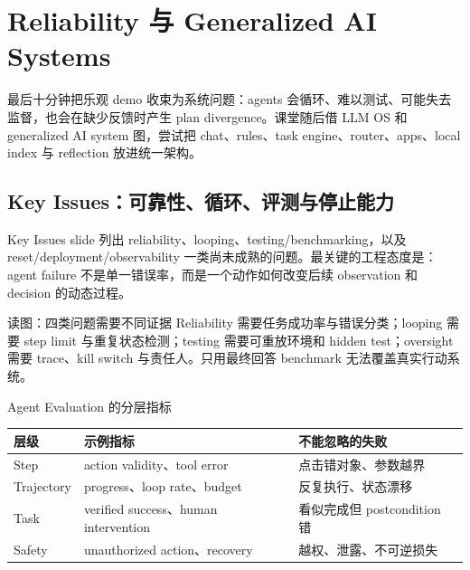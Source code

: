 \section{Reliability 与 Generalized AI Systems}

最后十分钟把乐观 demo 收束为系统问题：agents 会循环、难以测试、可能失去监督，也会在缺少反馈时产生 plan divergence。课堂随后借 LLM OS 和 generalized AI system 图，尝试把 chat、rules、task engine、router、apps、local index 与 reflection 放进统一架构。

\subsection{Key Issues：可靠性、循环、评测与停止能力}

Key Issues slide 列出 reliability、looping、testing/benchmarking，以及 reset/deployment/observability 一类尚未成熟的问题。最关键的工程态度是：agent failure 不是单一错误率，而是一个动作如何改变后续 observation 和 decision 的动态过程。


\begin{knowledgebox}{读图：四类问题需要不同证据}
Reliability 需要任务成功率与错误分类；looping 需要 step limit 与重复状态检测；testing 需要可重放环境和 hidden test；oversight 需要 trace、kill switch 与责任人。只用最终回答 benchmark 无法覆盖真实行动系统。
\end{knowledgebox}

\begin{importantbox}{Agent Evaluation 的分层指标}
\begin{tabularx}{\textwidth}{L{0.22\textwidth}X X}
\toprule
层级 & 示例指标 & 不能忽略的失败 \\
\midrule
Step & action validity、tool error & 点击错对象、参数越界 \\
Trajectory & progress、loop rate、budget & 反复执行、状态漂移 \\
Task & verified success、human intervention & 看似完成但 postcondition 错 \\
Safety & unauthorized action、recovery & 越权、泄露、不可逆损失 \\
\bottomrule
\end{tabularx}
\end{importantbox}


